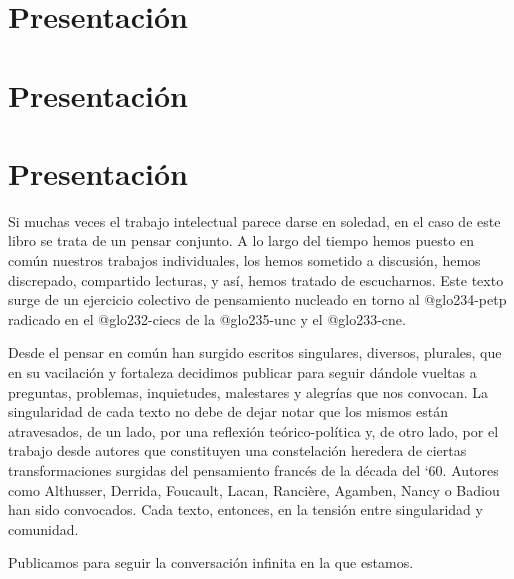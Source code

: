 \ifPDF
\chapter[\hspace{1.5pc}Presentación]{Presentación}
\setcounter{PrimPag}{\theCurrentPage}
\fi

\ifBNPDF
\chapter[\hspace{1.5pc}Presentación]{Presentación}
\fi

\ifHTMLEPUB
\chapter{Presentación}
\fi


Si muchas veces el trabajo intelectual parece darse en soledad, en el caso de este libro se trata de un pensar conjunto. A lo largo del tiempo hemos puesto en común nuestros trabajos individuales, los hemos sometido a discusión, hemos discrepado, compartido lecturas, y así, hemos tratado de escucharnos. Este texto surge de un ejercicio colectivo de pensamiento nucleado en torno al \gls{@glo234-petp} radicado en el \gls{@glo232-ciecs} de la \gls{@glo235-unc} y el \gls{@glo233-cne}.

Desde el pensar en común han surgido escritos singulares, diversos, plurales, que en su vacilación y fortaleza decidimos publicar para seguir dándole vueltas a preguntas, problemas, inquietudes, malestares y alegrías que nos convocan. La singularidad de cada texto no debe de dejar notar que los mismos están atravesados, de un lado, por una reflexión teórico-política y, de otro lado, por el trabajo desde autores que constituyen una constelación heredera de ciertas transformaciones surgidas del pensamiento francés de la década del `60. Autores como Althusser, Derrida, Foucault, Lacan, Rancière, Agamben, Nancy o Badiou han sido convocados. Cada texto, entonces, en la tensión entre singularidad y comunidad.

Publicamos para seguir la conversación infinita en la que estamos.

\ifPDF
{}
\fi